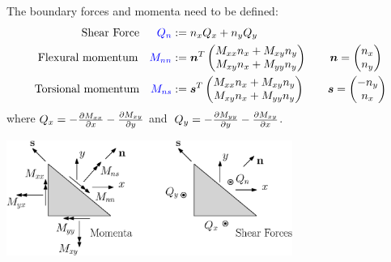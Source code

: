 \documentclass{beamer}
\begin{document}
\begin{frame}
The boundary forces and momenta need to be defined:
\begin{equation*}
\label{eq:QnMnnMns}
\begin{aligned}
\text{Shear Force} \; \; \quad \textcolor{blue}{Q_{n}} &:= n_x Q_x + n_y Q_y   \\
\text{Flexural momentum} \quad 
\textcolor{blue}{M_{nn}} &:= \bm{n}^T	
\begin{pmatrix}
M_{xx} n_x + M_{xy} n_y \\
M_{xy} n_x + M_{yy} n_y \\
\end{pmatrix} \qquad 
\bm{n} = 
\begin{pmatrix}
n_x \\
n_y \\
\end{pmatrix}
\\
\text{Torsional momentum} \quad \textcolor{blue}{M_{ns}} &:= \bm{s}^T	
\begin{pmatrix}
M_{xx} n_x + M_{xy} n_y \\
M_{xy} n_x + M_{yy} n_y \\
\end{pmatrix} \qquad 
\bm{s} = 
\begin{pmatrix}
-n_y \\
n_x \\
\end{pmatrix}
\end{aligned}
\end{equation*}
where $Q_x = - \diffp{M_{xx}}{x} -\diffp{M_{xy}}{y}$ and $\; Q_y = - \diffp{M_{yy}}{y} -\diffp{M_{xy}}{x}$.

\begin{tcolorbox}
\centering
\includegraphics[width=0.7\textwidth]{Cauchy_law.eps}
\end{tcolorbox}
\end{frame}
\end{document}
